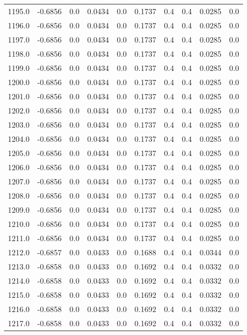 \begin{longtable}{lrrrrrrrrr}
1195.0 & -0.6856 & 0.0 & 0.0434 & 0.0 & 0.1737 & 0.4 & 0.4 & 0.0285 & 0.0 \\
1196.0 & -0.6856 & 0.0 & 0.0434 & 0.0 & 0.1737 & 0.4 & 0.4 & 0.0285 & 0.0 \\
1197.0 & -0.6856 & 0.0 & 0.0434 & 0.0 & 0.1737 & 0.4 & 0.4 & 0.0285 & 0.0 \\
1198.0 & -0.6856 & 0.0 & 0.0434 & 0.0 & 0.1737 & 0.4 & 0.4 & 0.0285 & 0.0 \\
1199.0 & -0.6856 & 0.0 & 0.0434 & 0.0 & 0.1737 & 0.4 & 0.4 & 0.0285 & 0.0 \\
1200.0 & -0.6856 & 0.0 & 0.0434 & 0.0 & 0.1737 & 0.4 & 0.4 & 0.0285 & 0.0 \\
1201.0 & -0.6856 & 0.0 & 0.0434 & 0.0 & 0.1737 & 0.4 & 0.4 & 0.0285 & 0.0 \\
1202.0 & -0.6856 & 0.0 & 0.0434 & 0.0 & 0.1737 & 0.4 & 0.4 & 0.0285 & 0.0 \\
1203.0 & -0.6856 & 0.0 & 0.0434 & 0.0 & 0.1737 & 0.4 & 0.4 & 0.0285 & 0.0 \\
1204.0 & -0.6856 & 0.0 & 0.0434 & 0.0 & 0.1737 & 0.4 & 0.4 & 0.0285 & 0.0 \\
1205.0 & -0.6856 & 0.0 & 0.0434 & 0.0 & 0.1737 & 0.4 & 0.4 & 0.0285 & 0.0 \\
1206.0 & -0.6856 & 0.0 & 0.0434 & 0.0 & 0.1737 & 0.4 & 0.4 & 0.0285 & 0.0 \\
1207.0 & -0.6856 & 0.0 & 0.0434 & 0.0 & 0.1737 & 0.4 & 0.4 & 0.0285 & 0.0 \\
1208.0 & -0.6856 & 0.0 & 0.0434 & 0.0 & 0.1737 & 0.4 & 0.4 & 0.0285 & 0.0 \\
1209.0 & -0.6856 & 0.0 & 0.0434 & 0.0 & 0.1737 & 0.4 & 0.4 & 0.0285 & 0.0 \\
1210.0 & -0.6856 & 0.0 & 0.0434 & 0.0 & 0.1737 & 0.4 & 0.4 & 0.0285 & 0.0 \\
1211.0 & -0.6856 & 0.0 & 0.0434 & 0.0 & 0.1737 & 0.4 & 0.4 & 0.0285 & 0.0 \\
1212.0 & -0.6857 & 0.0 & 0.0433 & 0.0 & 0.1688 & 0.4 & 0.4 & 0.0344 & 0.0 \\
1213.0 & -0.6858 & 0.0 & 0.0433 & 0.0 & 0.1692 & 0.4 & 0.4 & 0.0332 & 0.0 \\
1214.0 & -0.6858 & 0.0 & 0.0433 & 0.0 & 0.1692 & 0.4 & 0.4 & 0.0332 & 0.0 \\
1215.0 & -0.6858 & 0.0 & 0.0433 & 0.0 & 0.1692 & 0.4 & 0.4 & 0.0332 & 0.0 \\
1216.0 & -0.6858 & 0.0 & 0.0433 & 0.0 & 0.1692 & 0.4 & 0.4 & 0.0332 & 0.0 \\
1217.0 & -0.6858 & 0.0 & 0.0433 & 0.0 & 0.1692 & 0.4 & 0.4 & 0.0332 & 0.0 \\

\end{longtable}
